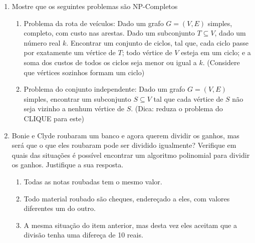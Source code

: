 \documentclass[12pt]{article}
\begin{document}
\begin{enumerate}
\item Mostre que os seguintes problemas são NP-Completos

\begin{enumerate}

\item Problema da rota de veículos: Dado um grafo $G = (V,E)$ simples, completo, com custo nas arestas. Dado um subconjunto $T\subseteq V$, dado um número real $k$. Encontrar um conjunto de ciclos, tal que, cada ciclo passe por exatamente um vértice de $T$; todo vértice de $V$ esteja em um ciclo; e a soma dos custos de todos os ciclos seja menor ou igual a $k$. (Considere que vértices sozinhos formam um ciclo)

\item Problema do conjunto independente: Dado um grafo $G = (V,E)$ simples, encontrar um subconjunto $S\subseteq V$ tal que cada vértice de $S$ não seja vizinho a nenhum vértice de $S$. (Dica: reduza o problema do CLIQUE para este)

\end{enumerate}

\item Bonie e Clyde roubaram um banco e agora querem dividir os ganhos, mas será que o que eles roubaram pode ser dividido igualmente? 
Verifique em quais das situações é possível encontrar um algoritmo polinomial para dividir os ganhos.
Justifique a sua resposta.

\begin{enumerate}

\item Todas as notas roubadas tem o mesmo valor.

\item Todo material roubado são cheques, endereçado a eles, com valores diferentes um do outro.

\item A mesma situação do item anterior, mas desta vez eles aceitam que a divisão tenha uma difereça de 10 reais.

\end{enumerate}





\end{enumerate}
\end{document}
